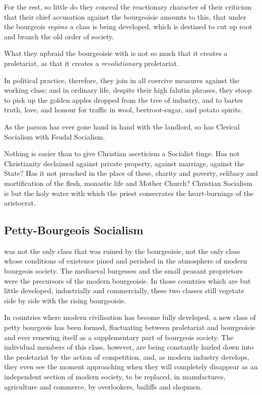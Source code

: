 For the rest, so little do they conceal the reactionary character of
their criticism that their chief accusation against the bourgeoisie
amounts to this, that under the bourgeois \textit{regime} a class is being
developed, which is destined to cut up root and branch the old order of
society.

What they upbraid the bourgeoisie with is not so much that it creates a
proletariat, as that it creates a \textit{revolutionary} proletariat.

In political practice, therefore, they join in all coercive measures
against the working class; and in ordinary life, despite their high
falutin phrases, they stoop to pick up the golden apples dropped from
the tree of industry, and to barter truth, love, and honour for traffic
in wool, beetroot-sugar, and potato spirits.

As the parson has ever gone hand in hand with the landlord, so has
Clerical Socialism with Feudal Socialism.

Nothing is easier than to give Christian asceticism a Socialist tinge.
Has not Christianity declaimed against private property, against
marriage, against the State? Has it not preached in the place of these,
charity and poverty, celibacy and mortification of the flesh, monastic
life and Mother Church? Christian Socialism is but the holy water with
which the priest consecrates the heart-burnings of the aristocrat.

\subsection*{Petty-Bourgeois Socialism}
 was not the only class that was ruined by the
bourgeoisie, not the only class whose conditions of existence pined and
perished in the atmosphere of modern bourgeois society. The mediaeval
burgesses and the small peasant proprietors were the precursors of the
modern bourgeoisie. In those countries which are but little developed,
industrially and commercially, these two classes still vegetate side by
side with the rising bourgeoisie.

In countries where modern civilisation has become fully developed, a
new class of petty bourgeois has been formed, fluctuating between
proletariat and bourgeoisie and ever renewing itself as a supplementary
part of bourgeois society. The individual members of this class,
however, are being constantly hurled down into the proletariat by the
action of competition, and, as modern industry develops, they even see
the moment approaching when they will completely disappear as an
independent section of modern society, to be replaced, in manufactures,
agriculture and commerce, by overlookers, bailiffs and shopmen.

